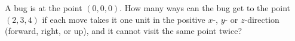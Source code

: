 A bug is at the point $(0,0,0)$. How many ways can the bug get to the point $(2,3,4)$ if each move takes it one unit in the positive $x$-, $y$- or $z$-direction (forward, right, or up), and it cannot visit the same point twice?
